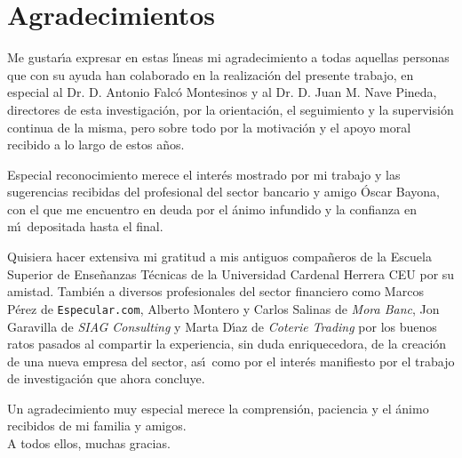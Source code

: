 \chapter*{Agradecimientos}
Me gustar\'\i a expresar en estas l\'\i neas mi agradecimiento a todas aquellas personas que con su ayuda han colaborado en la realizaci\'on del presente trabajo, en especial al Dr. D. Antonio Falc\'o Montesinos y al Dr. D. Juan M. Nave Pineda, directores de esta investigaci\'on, por la orientaci\'on, el seguimiento y la supervisi\'on continua de la misma, pero sobre todo por la motivaci\'on y el apoyo moral recibido a lo largo de estos a\~nos.

Especial reconocimiento merece el inter\'es mostrado por mi trabajo y las su\-ge\-ren\-cias recibidas del profesional del sector bancario y amigo \'Oscar Bayona, con el que me encuentro en deuda por el \'animo infundido y la confianza en m\'\i~depositada hasta el final. 

Quisiera hacer extensiva mi gratitud a mis antiguos compa\~neros de la Escuela Superior de Ense\~nanzas T\'ecnicas de la Universidad Cardenal Herrera CEU por su amistad. Tambi\'en a diversos profesionales del sector financiero como Marcos P\'erez de \verb+Especular.com+, Alberto Montero y Carlos Salinas de {\sl Mora Banc}, Jon Ga\-ra\-vi\-lla de {\sl SIAG Consulting} y Marta D\'\i az de {\sl Coterie Trading} por los buenos ratos pasados al compartir la experiencia, sin duda enriquecedora, de la creaci\'on de una nueva empresa del sector, as\'\i~como por el inter\'es manifiesto por el trabajo de investigaci\'on que ahora concluye.

Un agradecimiento muy especial merece la comprensi\'on, paciencia y el \'animo recibidos de mi familia y amigos.\\[.25cm]

A todos ellos, muchas gracias.

\newpage\mbox{}
\thispagestyle{empty}